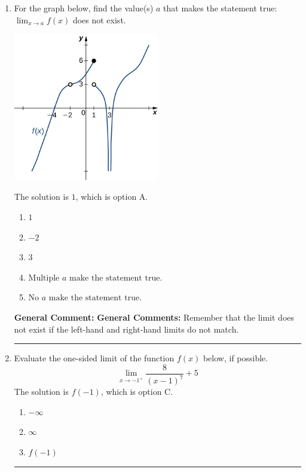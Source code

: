 \documentclass{extbook}[14pt]
\newcommand{\litem}[1]{\item #1

\rule{\textwidth}{0.4pt}}
\begin{document}
\begin{enumerate}\litem{
For the graph below, find the value(s) $a$ that makes the statement true: $ \displaystyle \lim_{x \rightarrow a} f(x)$ does not exist.

\begin{center}
    \includegraphics[width=0.5\textwidth]{../Figures/evaluateLimitGraphicallyCopyA.png}
\end{center}


The solution is \( 1 \), which is option A.\begin{enumerate}[label=\Alph*.]
\item \( 1 \)


\item \( -2 \)


\item \( 3 \)


\item \( \text{Multiple } a \text{ make the statement true}. \)


\item \( \text{No } a \text{ make the statement true}. \)


\end{enumerate}

\textbf{General Comment:} \textbf{General Comments:} Remember that the limit does not exist if the left-hand and right-hand limits do not match.
}
\litem{
Evaluate the one-sided limit of the function $f(x)$ below, if possible.
\[ \lim_{x \rightarrow -1^+} \frac{8}{(x-1)^7}+5 \]The solution is \( f(-1) \), which is option C.\begin{enumerate}[label=\Alph*.]
\item \( -\infty \)


\item \( \infty \)


\item \( f(-1) \)



\end{enumerate}}
\end{enumerate}
\end{document}
